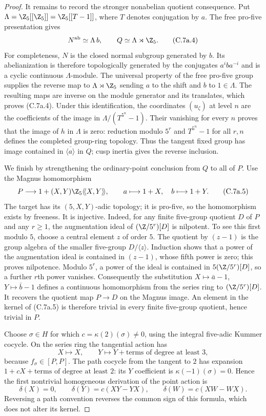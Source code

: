 \begin{proof}
It remains to record the stronger nonabelian quotient consequence.
Put $\Lambda=\Z_5[[\Z_5]]=\Z_5[[T-1]]$, where $T$ denotes conjugation
by $a$. The free pro-five presentation gives
\[
 N^{\rm ab}\simeq\Lambda\,b,\qquad Q\simeq\Lambda\rtimes\Z_5.
                                                               \tag{C.7a.4}
\]
For completeness, $N$ is the closed normal subgroup generated by $b$.
Its abelianization is therefore topologically generated by the conjugates
$a^i b a^{-i}$ and is a cyclic continuous $\Lambda$-module. The universal
property of the free pro-five group supplies the reverse map to
$\Lambda\rtimes\Z_5$ sending $a$ to the shift and $b$ to $1\in\Lambda$.
The resulting maps are inverse on the module generator and its translates,
which proves (C.7a.4). Under this identification, the coordinates
$(u_\zeta)$ at level $n$ are the coefficients of the image in
$\Lambda/(T^{5^n}-1)$. Their vanishing for every $n$ proves that the image
of $h$ in $\Lambda$ is zero: reduction modulo $5^r$ and $T^{5^n}-1$
for all $r,n$ defines the completed group-ring topology. Thus the tangent
fixed group has image contained in $\overline{\langle a\rangle}$ in $Q$;
cusp inertia gives the reverse inclusion.

We finish by strengthening the ordinary-point conclusion from $Q$ to
all of $P$. Use the Magnus homomorphism
\[
 P\longrightarrow 1+(X,Y)\Z_5\langle\!\langle X,Y\rangle\!\rangle,
 \qquad a\longmapsto1+X,\quad b\longmapsto1+Y.                  \tag{C.7a.5}
\]
The target has its $(5,X,Y)$-adic topology; it is pro-five, so the
homomorphism exists by freeness. It is injective. Indeed, for any finite
five-group quotient $D$ of $P$ and any $r\ge1$, the augmentation ideal
of $(\Z/5^r)[D]$ is nilpotent. To see this first modulo $5$, choose a
central element $z$ of order $5$. The quotient by $(z-1)$ is the group
algebra of the smaller five-group $D/\langle z\rangle$. Induction shows
that a power of the augmentation ideal is contained in $(z-1)$, whose
fifth power is zero; this proves nilpotence. Modulo $5^r$, a power of the
ideal is contained in $5(\Z/5^r)[D]$, so a further $r$th power vanishes.
Consequently the substitution $X\mapsto\bar a-1$, $Y\mapsto\bar b-1$
defines a continuous homomorphism from the series ring to $(\Z/5^r)[D]$.
It recovers the quotient map $P\to D$ on the Magnus image. An element
in the kernel of (C.7a.5) is therefore trivial in every finite five-group
quotient, hence trivial in $P$.

Choose $\sigma\in H$ for which $c=\kappa(2)(\sigma)\ne0$, using the
integral five-adic Kummer cocycle. On the series ring the tangential
action has
\[
 X\longmapsto X,\qquad Y\longmapsto Y+\text{terms of degree at least }3,
\]
because $f_\sigma\in[P,P]$. The path cocycle from the tangent to $2$
has expansion $1+cX+\text{terms of degree at least }2$: its $Y$
coefficient is $\kappa(-1)(\sigma)=0$. Hence the first nontrivial
homogeneous derivation of the point action is
\[
 \delta(X)=0,\qquad \delta(Y)=c(XY-YX),\qquad
 \delta(W)=c(XW-WX).                                          \tag{C.7a.6}
\]
Reversing a path convention reverses the common sign of this formula,
which does not alter its kernel.


\end{proof}
